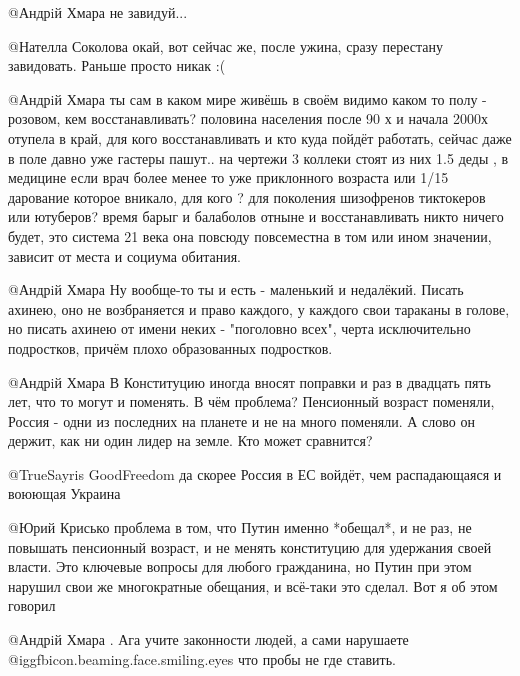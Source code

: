 \begin{itemize}
\begin{itemize}

@Андрiй Хмара  не завидуй...


@Нателла Соколова  окай, вот сейчас же, после ужина, сразу перестану
завидовать. Раньше просто никак :(


@Андрiй Хмара  ты сам в каком мире живёшь в своём видимо каком то полу -
розовом, кем восстанавливать? половина населения после 90 х и начала 2000х
отупела в край, для кого восстанавливать и кто куда пойдёт работать, сейчас
даже в поле давно уже гастеры пашут.. на чертежи 3 коллеки стоят из них 1.5
деды , в медицине если врач более менее то уже приклонного возраста или 1/15
дарование которое вникало, для кого ? для поколения шизофренов тиктокеров или
ютуберов? время барыг и балаболов отныне и восстанавливать никто ничего будет,
это система 21 века она повсюду повсеместна в том или ином значении, зависит
от места и социума обитания.



@Андрiй Хмара  Ну вообще-то ты и есть - маленький и недалёкий. Писать ахинею,
оно не возбраняется и право каждого, у каждого свои тараканы в голове, но
писать ахинею от имени неких - "поголовно всех", черта исключительно
подростков, причём плохо образованных подростков.


@Андрiй Хмара В Конституцию иногда вносят поправки и раз в двадцать пять лет,
что то могут и поменять. В чём проблема? Пенсионный возраст поменяли,
Россия - одни из последних на планете и не на много поменяли. А слово он
держит, как ни один лидер на земле. Кто может сравнится?


@TrueSayris GoodFreedom  да скорее Россия в ЕС войдёт, чем распадающаяся и
воюющая Украина


@Юрий Крисько  проблема в том, что Путин именно *обещал*, и не раз, не
повышать пенсионный возраст, и не менять конституцию для удержания своей
власти. Это ключевые вопросы для любого гражданина, но Путин при этом нарушил
свои же многократные обещания, и всё-таки это сделал. Вот я об этом говорил


@Андрiй Хмара . Ага учите законности людей, а сами нарушаете  @igg{fbicon.beaming.face.smiling.eyes}  что пробы не
где ставить.


\end{itemize}
\end{itemize}
